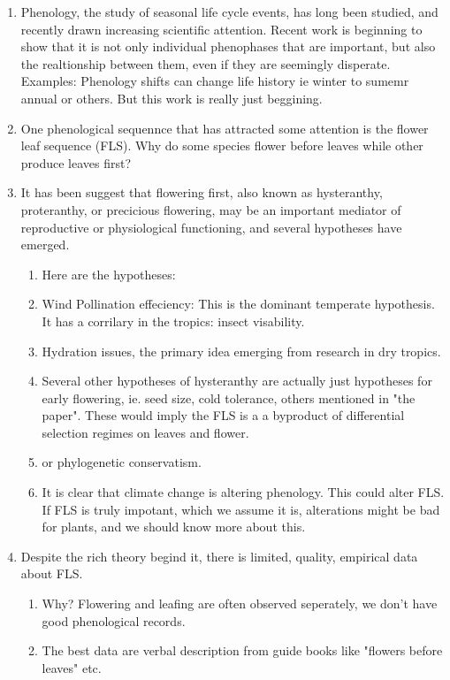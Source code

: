 \documentclass{article}\usepackage[]{graphicx}\usepackage[]{color}
\begin{document}

\begin{enumerate}
\item Phenology, the study of seasonal life cycle events, has long been studied, and recently drawn increasing scientific attention. Recent work is beginning to show that it is not only individual phenophases that are important, but also the realtionship between them, even if they are seemingly disperate. Examples: Phenology shifts can change life history ie winter to sumemr annual or others. But this work is really just beggining.
\item One phenological sequennce that has attracted some attention is the flower leaf sequence (FLS). Why do some species flower before leaves while other produce leaves first?
\item It has been suggest that flowering first, also known as hysteranthy, proteranthy, or precicious flowering, may be an important mediator of reproductive or physiological functioning, and several hypotheses have emerged.
\begin{enumerate}
\item  Here are the hypotheses:
\item Wind Pollination effeciency: This is the dominant temperate hypothesis. It has a  corrilary in the tropics: insect visability.
\item Hydration issues, the primary idea emerging from research in dry tropics.
\item Several other hypotheses of hysteranthy are actually just hypotheses for early flowering, ie. seed size, cold tolerance, others mentioned in "the paper". These would imply the FLS is a a byproduct of differential selection regimes on leaves and flower.
\item or phylogenetic conservatism.
\item It is clear that climate change is altering phenology. This could alter FLS. If FLS is truly impotant, which we assume it is, alterations might be bad for plants, and we should know more about this.
\end{enumerate}
\item Despite the rich theory begind it, there is limited, quality, empirical data about FLS.
\begin{enumerate} 
\item Why? Flowering and leafing are often observed seperately, we don't have good phenological records.
\item The best data are verbal description from guide books like "flowers before leaves" etc.

\end{enumerate}
\end{enumerate}
\end{document}
